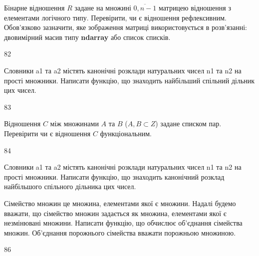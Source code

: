 Бінарне відношення $R$ задане на множині $\overline{0,n-1}$ матрицею відношення з елементами логічного типу. Перевірити, чи є відношення рефлексивним. Обов'язково зазначити, яке зображення матриці використовується в розв'язанні: двовимірний масив типу \textbf{ndarray} або список списків.
\\\par
82 














Словники a1 та a2 містять канонічні розклади натуральних чисел n1 та n2 на прості множники. Написати функцію, що знаходить найбільший спільний дільник цих чисел.
\\\par
83 














Відношення $C$ між множинами $A$ та $B$ ($A, B\subset Z$) задане списком пар. Перевірити чи є відношення $C$ функціональним.
\\\par
84 














Словники a1 та a2 містять канонічні розклади натуральних чисел n1 та n2 на прості множники. Написати функцію, що знаходить канонічний розклад найбільшого спільного дільника цих чисел.
\\\par
{} 














Сімейство множин це множина, елементами якої є множини. Надалі будемо вважати, що сімейство множин задається як множина, елементами якої є незмінювані множини. Написати функцію, що обчислює об'єднання сімейства множин. Об'єднання порожнього сімейства вважати порожньою множиною.
\\\par
86 














